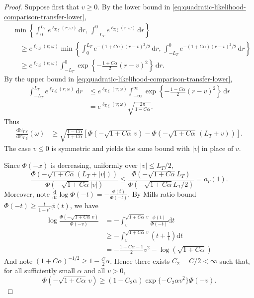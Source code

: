 \documentclass[10pt]{article}
\newcommand{\dd}{\mathrm{d}}
\theoremstyle{plain}
\begin{document}
\begin{proof}
Suppose first that $v\ge0$. By the lower bound in
\eqref{eq:quadratic-likelihood-comparison-transfer-lower},
\[
\begin{aligned}
    &\min\left\{
        \int_0^{L_T}
            e^{\ell_{T,\xi}(r;\omega)}
        \,\dd r,\,
        \int_{-L_T}^{0}
            e^{\ell_{T,\xi}(r;\omega)}
        \,\dd r
    \right\} \\
    &\quad\ge e^{\ell_{T,\xi}(v;\omega)}\min\left\{
        \int_0^{L_T}
            e^{-(1+C\alpha)(r-v)^2/2}
        \,\dd r,\,
        \int_{-L_T}^{0}
            e^{-(1+C\alpha)(r-v)^2/2}
        \,\dd r
    \right\} \\
    &\quad\ge
    e^{\ell_{T,\xi}(v;\omega)}
    \int_{-L_T}^{0}
        \exp\left\{
            -\frac{1+C\alpha}{2}(r-v)^2
        \right\}
    \,\dd r.
\end{aligned}
\]
By the upper bound in
\eqref{eq:quadratic-likelihood-comparison-transfer-lower},
\[
\begin{aligned}
    \int_{-L_T}^{L_T}
        e^{\ell_{T,\xi}(r;\omega)}
    \,\dd r
    &\le
    e^{\ell_{T,\xi}(v;\omega)}
    \int_{-\infty}^{\infty}
        \exp\left\{
            -\frac{1-C\alpha}{2}(r-v)^2
        \right\}
    \,\dd r\\
    &=
    e^{\ell_{T,\xi}(v;\omega)}
    \sqrt{\frac{2\pi}{1-C\alpha}}.
\end{aligned}
\]
Thus
\[
\begin{aligned}
    \frac{\dd\mathbb N_{T,\xi}}
         {\dd\mathbb M_{T,\xi}}(\omega)
    &\ge
    \sqrt{
        \frac{1-C\alpha}{1+C\alpha}
    }
    \left[
        \Phi\left(
            -\sqrt{1+C\alpha}\,v
        \right)
        -
        \Phi\left(
            -\sqrt{1+C\alpha}\,(L_T+v)
        \right)
    \right].
\end{aligned}
\]
The case $v\le0$ is symmetric and yields the same bound with $|v|$ in
place of $v$.

Since $\Phi(-x)$ is decreasing, uniformly over $|v|\le L_T/2$, 
\[
    \frac{
        \Phi\left(
            -\sqrt{1+C\alpha}(L_T+|v|)
        \right)
    }{
        \Phi\left(
            -\sqrt{1+C\alpha}|v|
        \right)
    }
    \leq \frac{\Phi\left(-\sqrt{1+C\alpha} L_T\right)}{ \Phi\left(-\sqrt{1+C\alpha}L_T/2\right)}
    =
    o_T(1).
\]
Moreover, note $\frac{\dd}{\dd t}  \log \Phi(-t) = -\frac{\phi(t)}{\Phi(-t)}$. By Mills ratio bound $\Phi(-t)\geq \frac{t}{1+t^2}\phi(t)$, we have $$
\begin{aligned}
\log \frac{\Phi\left(-\sqrt{1+C\alpha}\,v\right)}{\Phi\left(-v\right)} 
&= -\int^{\sqrt{1+C\alpha}\,v}_v \frac{\phi(t)}{\Phi(-t)} \dd t \\
&\geq -\int^{\sqrt{1+C\alpha}\,v}_v (t+\frac{1}{t}) \dd t \\
&= -\frac{1+C\alpha-1}{2}v^2 - \log\left(\sqrt{1+C\alpha}\right)
\end{aligned}
$$
And note $(1+C\alpha)^{-1/2}\geq 1-\frac{C}{2}\alpha$. Hence there exists $C_2=C/2<\infty$ such that, for all sufficiently small
$\alpha$ and all $v>0$,
\[
    \Phi\left(
        -\sqrt{1+C\alpha}\,v
    \right)
    \ge
    (1-C_2\alpha)
    \exp\{-C_2\alpha v^2\}
    \Phi(-v).
\]



\end{proof}
\end{document}
